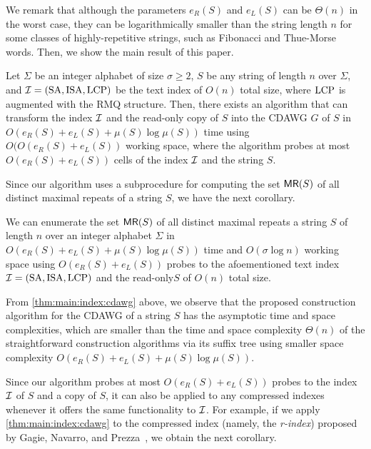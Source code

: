 \documentclass{article}
\begin{document}
We remark that although the parameters $e_R(S)$ and $e_L(S)$ can be $\Theta(n)$ in the worst case, they can be logarithmically smaller than the string length $n$ for some classes of highly-repetitive strings, such as Fibonacci and Thue-Morse words. 
Then, we show the main result of this paper. 

\begin{theorem}\label{thm:main:index:cdawg}
  Let
  $\Sigma$ be an integer alphabet of size $\sigma \ge 2$, 
  $S$ be any string of length $n$ over $\Sigma$, and
  $\mathcal{I} = (\mathrm{SA}, \mathrm{ISA}, \mathrm{LCP})$ be the text index of $O(n)$ total size, where $\mathrm{LCP}$ is augmented with the RMQ structure. Then, there exists an algorithm that can transform the index $\mathcal{I}$ and the read-only copy of $S$ into the CDAWG $G$ of $S$
  in $O(e_R(S) + e_L(S) + \mu(S)\log\mu(S))$ time
  using
  $O(O(e_R(S) + e_L(S))$ working space,
  where the algorithm probes at most $O(e_R(S) + e_L(S))$ cells of the index $\mathcal{I}$ and the string $S$. 
\end{theorem}

Since our algorithm uses a subprocedure for computing the set $\textsf{MR}(S)$ of all distinct maximal repeats of a string $S$, we have the next corollary.


\begin{corollary}\label{cor:main:index:maxrep}
We can enumerate the set $\textsf{MR}(S)$ of all distinct maximal repeats a string $S$ of length $n$ over an integer alphabet $\Sigma$ in $O(e_R(S)+e_L(S) + \mu(S)\log \mu(S))$ time and $O(\sigma \log n)$ working space
  using $O(e_R(S) + e_L(S))$ probes to the afoementioned text index $\mathcal{I} = (\mathrm{SA}, \mathrm{ISA}, \mathrm{LCP})$ and the read-only$S$ of $O(n)$ total size. 
\end{corollary}

From \cref{thm:main:index:cdawg} above, we observe that the proposed construction algorithm for the CDAWG of a string $S$ has the asymptotic time and space complexities, which are smaller than the time and space complexity $\Theta(n)$ of the straightforward construction algorithms via its suffix tree using smaller space complexity $O(e_R(S)+e_L(S) + \mu(S)\log \mu(S))$.


Since our algorithm probes at most $O(e_R(S) + e_L(S))$ probes to the index $\mathcal{I}$ of $S$ and a copy of $S$, it can also be applied to any compressed indexes whenever it offers the same functionality to $\mathcal{I}$. For example, if we apply \cref{thm:main:index:cdawg} to the compressed index (namely, the \textit{r-index}) proposed by Gagie, Navarro, and Prezza~\cite{gagie:navarro:prezza2020fully}, we obtain the next corollary. 
\end{document}
